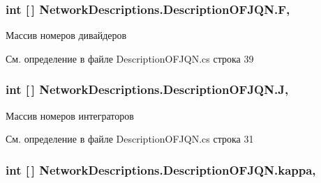 \subsubsection[{\texorpdfstring{F}{F}}]{\setlength{\rightskip}{0pt plus 5cm}int \mbox{[}$\,$\mbox{]} Network\+Descriptions.\+Description\+O\+F\+J\+Q\+N.\+F\hspace{0.3cm}{\ttfamily [get]}, {\ttfamily [set]}}\hypertarget{class_network_descriptions_1_1_description_o_f_j_q_n_aaadbe1cc3f0bdb0bef593d2b732c988f}{}\label{class_network_descriptions_1_1_description_o_f_j_q_n_aaadbe1cc3f0bdb0bef593d2b732c988f}


Массив номеров дивайдеров 



См. определение в файле Description\+O\+F\+J\+Q\+N.\+cs строка 39

\subsubsection[{\texorpdfstring{J}{J}}]{\setlength{\rightskip}{0pt plus 5cm}int \mbox{[}$\,$\mbox{]} Network\+Descriptions.\+Description\+O\+F\+J\+Q\+N.\+J\hspace{0.3cm}{\ttfamily [get]}, {\ttfamily [set]}}\hypertarget{class_network_descriptions_1_1_description_o_f_j_q_n_a75cf16b40e07c708c6580d331e692de0}{}\label{class_network_descriptions_1_1_description_o_f_j_q_n_a75cf16b40e07c708c6580d331e692de0}


Массив номеров интеграторов 



См. определение в файле Description\+O\+F\+J\+Q\+N.\+cs строка 31

\subsubsection[{\texorpdfstring{kappa}{kappa}}]{\setlength{\rightskip}{0pt plus 5cm}int \mbox{[}$\,$\mbox{]} Network\+Descriptions.\+Description\+O\+F\+J\+Q\+N.\+kappa\hspace{0.3cm}{\ttfamily [get]}, {\ttfamily [set]}}\hypertarget{class_network_descriptions_1_1_description_o_f_j_q_n_a3a88e6ce220ecbbe4a056fedc8d6595c}{}\label{class_network_descriptions_1_1_description_o_f_j_q_n_a3a88e6ce220ecbbe4a056fedc8d6595c}


